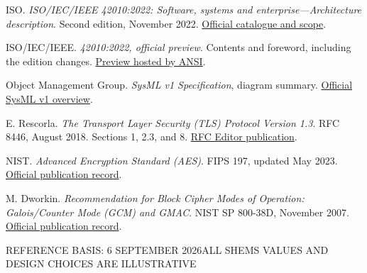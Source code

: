 \documentclass[11pt,letterpaper]{article}
\begin{document}
\begingroup
\small
\setlength{\parskip}{2pt}
\renewcommand{\refname}{}
\makeatletter
\renewenvironment{thebibliography}[1]
 {\list{[\arabic{enumiv}]}{\settowidth\labelwidth{[#1]}%
  \leftmargin\labelwidth\advance\leftmargin\labelsep
  \usecounter{enumiv}\setlength{\itemsep}{7pt}\setlength{\parsep}{0pt}}
  \sloppy{}}
 {\endlist}
\makeatother
\begin{thebibliography}{6}
 ISO. \emph{ISO/IEC/IEEE 42010:2022: Software, systems and
enterprise---Architecture description}. Second edition, November 2022.
\href{https://www.iso.org/standard/74393.html}{Official catalogue and scope}.

 ISO/IEC/IEEE. \emph{42010:2022, official preview}.
Contents and foreword, including the edition changes.
\href{https://webstore.ansi.org/preview-pages/iso/preview_iso\%2Biec\%2Bieee\%2B42010-2022.pdf}{Preview hosted by ANSI}.

 Object Management Group. \emph{SysML v1 Specification},
diagram summary. \href{https://www.omg.org/sysml/sysmlv1/}{Official SysML v1 overview}.

 E. Rescorla. \emph{The Transport Layer Security (TLS) Protocol
Version 1.3}. RFC 8446, August 2018. Sections 1, 2.3, and 8.
\href{https://www.rfc-editor.org/rfc/rfc8446.html}{RFC Editor publication}.

 NIST. \emph{Advanced Encryption Standard (AES)}.
FIPS 197, updated May 2023.
\href{https://www.nist.gov/publications/advanced-encryption-standard-aes-0}{Official publication record}.

 M. Dworkin. \emph{Recommendation for Block Cipher Modes of
Operation: Galois/Counter Mode (GCM) and GMAC}. NIST SP 800-38D, November 2007.
\href{https://csrc.nist.gov/pubs/sp/800/38/d/final}{Official publication record}.
\end{thebibliography}
\endgroup

\vfill
{\sffamily\scriptsize\color{Muted}REFERENCE BASIS: 6 SEPTEMBER 2026\enspace\textbullet\enspace ALL SHEMS VALUES AND DESIGN CHOICES ARE ILLUSTRATIVE}
\end{document}

